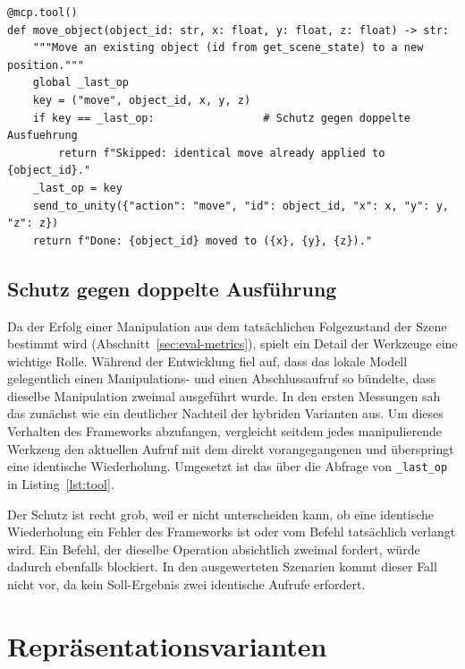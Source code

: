 \begin{listing}[htbp]
\begin{verbatim}
@mcp.tool()
def move_object(object_id: str, x: float, y: float, z: float) -> str:
    """Move an existing object (id from get_scene_state) to a new position."""
    global _last_op
    key = ("move", object_id, x, y, z)
    if key == _last_op:                 # Schutz gegen doppelte Ausfuehrung
        return f"Skipped: identical move already applied to {object_id}."
    _last_op = key
    send_to_unity({"action": "move", "id": object_id, "x": x, "y": y, "z": z})
    return f"Done: {object_id} moved to ({x}, {y}, {z})."
\end{verbatim}
\caption{Beispiel einer Werkzeugdefinition (gekürzt). Der Dokumentationskommentar dient dem Agenten als Beschreibung des Werkzeugs.}
\label{lst:tool}
\end{listing}

\subsection*{Schutz gegen doppelte Ausführung}

Da der Erfolg einer Manipulation aus dem tatsächlichen Folgezustand der Szene bestimmt wird (Abschnitt~\ref{sec:eval-metrics}), spielt ein Detail der Werkzeuge eine wichtige Rolle.
Während der Entwicklung fiel auf, dass das lokale Modell gelegentlich einen Manipulations- und einen Abschlussaufruf so bündelte, dass dieselbe Manipulation zweimal ausgeführt wurde.
In den ersten Messungen sah das zunächst wie ein deutlicher Nachteil der hybriden Varianten aus.
Um dieses Verhalten des Frameworks abzufangen, vergleicht seitdem jedes manipulierende Werkzeug den aktuellen Aufruf mit dem direkt vorangegangenen und überspringt eine identische Wiederholung.
Umgesetzt ist das über die Abfrage von \texttt{\_last\_op} in Listing~\ref{lst:tool}.

Der Schutz ist recht grob, weil er nicht unterscheiden kann, ob eine identische Wiederholung ein Fehler des Frameworks ist oder vom Befehl tatsächlich verlangt wird.
Ein Befehl, der dieselbe Operation absichtlich zweimal fordert, würde dadurch ebenfalls blockiert.
In den ausgewerteten Szenarien kommt dieser Fall nicht vor, da kein Soll-Ergebnis zwei identische Aufrufe erfordert.


\section{Repräsentationsvarianten}
\label{sec:impl-variants}

